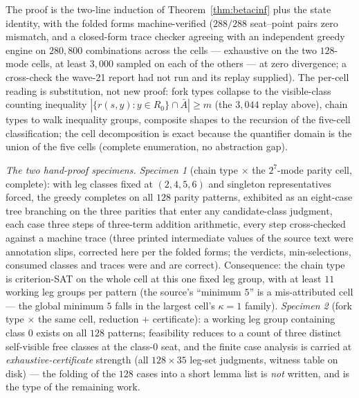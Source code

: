 The proof is the two-line induction of Theorem~\ref{thm:betacinf} plus the state
identity, with the folded forms machine-verified ($288/288$ seat--point pairs zero
mismatch, and a closed-form trace checker agreeing with an independent greedy engine on
$280{,}800$ combinations across the cells --- exhaustive on the two $128$-mode cells,
at least $3{,}000$ sampled on each of the others --- at zero divergence; a cross-check
the wave-21 report had not run and its replay supplied). The per-cell reading is
substitution, not new proof: fork types collapse to the visible-class counting
inequality $|\{r(s,y):y\in R_0\}\cap\bar A|\ge m$ (the $3{,}044$ replay above), chain
types to walk inequality groups, composite shapes to the recursion of the five-cell
classification; the cell
decomposition is exact because the quantifier domain is the union of the five cells
(complete enumeration, no abstraction gap).

\emph{The two hand-proof specimens.} \emph{Specimen 1} (chain type $\times$ the
$2^7$-mode parity cell, complete): with leg classes fixed at $(2,4,5,6)$ and singleton
representatives forced, the greedy completes on all $128$ parity patterns, exhibited as
an eight-case tree branching on the three parities that enter any candidate-class
judgment, each case three steps of three-term addition arithmetic, every step
cross-checked against a machine trace (three printed intermediate values of the source
text were annotation slips, corrected here per the folded forms; the verdicts,
min-selections, consumed classes and traces were and are correct). Consequence: the
chain type is criterion-SAT on the whole cell at this one fixed leg group, with at least
$11$ working leg groups per pattern (the source's ``minimum $5$'' is a mis-attributed
cell --- the global minimum $5$ falls in the largest cell's $\kappa{=}1$ family).
\emph{Specimen 2} (fork type
$\times$ the same cell, reduction $+$ certificate): a working leg group containing class
$0$ exists on all $128$ patterns; feasibility reduces to a count of
three distinct self-visible free classes at the class-$0$ seat, and the finite case
analysis is carried at \emph{exhaustive-certificate} strength (all $128\times 35$
leg-set judgments, witness table on disk) --- the folding of the $128$ cases into a
short lemma list is \emph{not} written, and is the type of the remaining work.

